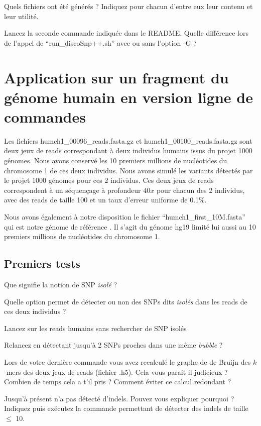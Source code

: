 \qu Quels fichiers ont été générés ? Indiquez pour chacun d'entre eux leur contenu et leur utilité. 

\qu Lancez la seconde commande indiquée dans le README. Quelle différence lors de l'appel de ``run\_discoSnp++.sh'' avec ou sans l'option -G ?

\section*{Application sur un fragment du génome humain en version ligne de commandes}
Les fichiers humch1\_00096\_reads.fasta.gz et humch1\_00100\_reads.fasta.gz sont deux jeux de reads correspondant à deux individus humains issus du projet 1000 génomes.  Nous avons conservé les 10  premiers millions de nucléotides du chromosome 1 de ces deux individus. Nous avons simulé les variants détectés par le projet 1000 génomes pour ces 2 individus. Ces deux jeux de reads correspondent à un séquençage à profondeur $40x$ pour chacun des 2 individus, avec des reads de taille 100 et un taux d'erreur uniforme de 0.1\%.



Nous avons également à notre disposition le fichier ``humch1\_first\_10M.fasta'' qui est notre génome de référence . Il s'agit du génome hg19 limité lui aussi au 10  premiers millions de nucléotides du chromosome 1.


\subsection*{Premiers tests}
\qu Que signifie la notion de SNP \emph{isolé} ?

\qu Quelle option permet  de détecter ou non des SNPs dits \emph{isolés} dans les reads de ces deux individus ? 

\qu Lancez \discopp sur les reads humains sans rechercher de SNP isolés

\qu Relancez \discopp en détectant jusqu'à 2 SNPs proches dans une même \emph{bubble} ?

\qu Lors de votre dernière commande vous avez recalculé le graphe de de Bruijn des $k$-mers des deux jeux de reads (fichier .h5). Cela vous parait il judicieux ? Combien de temps cela a t'il pris ? Comment éviter ce calcul redondant ? 


\qu Jusqu'à présent \discopp n'a pas détecté d'indels. Pouvez vous expliquer pourquoi ? Indiquez puis exécutez la commande permettant de détecter des indels de taille $\leq$ 10.


